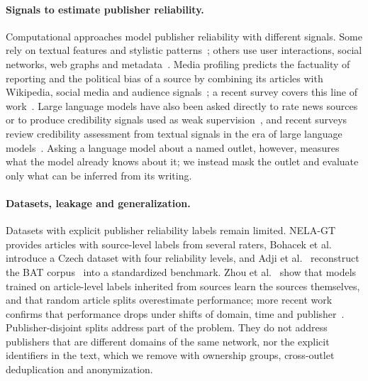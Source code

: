 \documentclass[11pt,a4paper]{article}
\begin{document}
\paragraph{Signals to estimate publisher reliability.}
Computational approaches model publisher reliability with different signals. Some rely on textual features and
stylistic patterns~\cite{przybyla2020capturing}; others use user interactions, social networks, web graphs and
metadata~\cite{bazmi2023multi,DBLP:conf/ecir/PratelliSP25,DBLP:conf/icwsm/WilliamsCC25,DBLP:journals/jdiq/LongoZCZC25}.
Media profiling predicts the factuality of reporting and the political bias of a source by combining its articles with
Wikipedia, social media and audience signals~\cite{baly2018predicting,baly2020written}; a recent survey covers this
line of work~\cite{nakov2024survey}. Large language models have also been asked directly to rate news
sources~\cite{yang2023large} or to produce credibility signals used as weak supervision~\cite{Leite2025}, and recent
surveys review credibility assessment from textual signals in the era of large language models~\cite{10.1145/3770077}.
Asking a language model about a named outlet, however, measures what the model already knows about it; we instead
mask the outlet and evaluate only what can be inferred from its writing.

\paragraph{Datasets, leakage and generalization.}
Datasets with explicit publisher reliability labels remain limited. NELA-GT~\cite{gruppi2021nela} provides articles
with source-level labels from several raters, Bohacek et al.~\cite{bohavcek2022fine} introduce a Czech dataset with
four reliability levels, and Adji et al.~\cite{DBLP:journals/dbsk/AdjiLS26} reconstruct the BAT
corpus~\cite{batDataset} into a standardized benchmark. Zhou et al.~\cite{zhou2021hidden} show that models trained on
article-level labels inherited from sources learn the sources themselves, and that random article splits overestimate
performance; more recent work confirms that performance drops under shifts of domain, time and
publisher~\cite{azizov-etal-2024-safari,burdisso-etal-2024-reliability,verhoeven2025yesterday}. Publisher-disjoint
splits address part of the problem. They do not address publishers that are different domains of the same network,
nor the explicit identifiers in the text, which we remove with ownership groups, cross-outlet deduplication and
anonymization.
\end{document}
